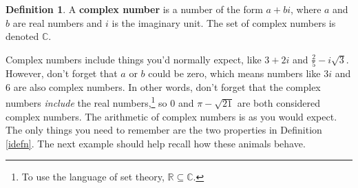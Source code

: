 \documentclass[11pt]{article}
\theoremstyle{definition}  %
\newtheorem{defn}{\bf Definition}
\newcommand{\bbm}{\begin{boxedminipage}{6.41in}}
\newcommand{\ebm}{\end{boxedminipage}}
\newcommand{\R}{\mathbb{R}}
\renewcommand{\C}{\mathbb{C}}
\begin{document}
\medskip

\colorbox{ResultColor}{\bbm
\begin{defn} \label{complexdefn} A \textbf{complex number} is a number of the form $a+bi$, where $a$ and $b$ are real numbers and $i$ is the imaginary unit.  The set of complex numbers is denoted $\C$.
\end{defn}
\ebm}

\medskip

Complex numbers include things you'd normally expect, like $3+2i$ and $\frac{2}{5} - i\sqrt{3}$.  However, don't forget that $a$ or $b$ could be zero, which means numbers like $3i$ and $6$ are also complex numbers.  In other words, don't forget that the complex numbers \textit{include} the real numbers,\footnote{To use the language  of set theory, $\R \subseteq \C$.} so $0$ and $\pi - \sqrt{21}$ are both considered complex numbers.   The arithmetic of complex numbers is as you would expect.  The only things you need to remember are the two properties in Definition \ref{idefn}.  The next example should help recall how these animals behave.
\end{document}
